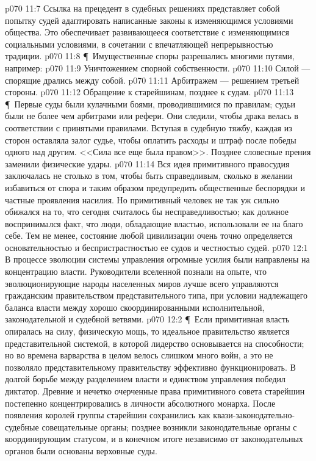 \vs p070 11:7 Ссылка на прецедент в судебных решениях представляет собой попытку судей адаптировать написанные законы к изменяющимся условиями общества. Это обеспечивает развивающееся соответствие с изменяющимися социальными условиями, в сочетании с впечатляющей непрерывностью традиции.
\vs p070 11:8 \P\ Имущественные споры разрешались многими путями, например:
\vs p070 11:9 \bibnobreakspace Уничтожением спорной собственности.
\vs p070 11:10 \bibnobreakspace Силой --- спорящие дрались между собой.
\vs p070 11:11 \bibnobreakspace Арбитражем --- решением третьей стороны.
\vs p070 11:12 \bibnobreakspace Обращение к старейшинам, позднее к судам.
\vs p070 11:13 \P\ Первые суды были кулачными боями, проводившимися по правилам; судьи были не более чем арбитрами или рефери. Они следили, чтобы драка велась в соответствии с принятыми правилами. Вступая в судебную тяжбу, каждая из сторон оставляла залог судье, чтобы оплатить расходы и штраф после победы одного над другим. <<Сила все еще была правом>>. Позднее словесные прения заменили физические удары.
\vs p070 11:14 Вся идея примитивного правосудия заключалась не столько в том, чтобы быть справедливым, сколько в желании избавиться от спора и таким образом предупредить общественные беспорядки и частные проявления насилия. Но примитивный человек не так уж сильно обижался на то, что сегодня считалось бы несправедливостью; как должное воспринимался факт, что люди, обладающие властью, использовали ее на благо себе. Тем не менее, состояние любой цивилизации очень точно определяется основательностью и беспристрастностью ее судов и честностью судей.
\vs p070 12:1 В процессе эволюции системы управления огромные усилия были направлены на концентрацию власти. Руководители вселенной познали на опыте, что эволюционирующие народы населенных миров лучше всего управляются гражданским правительством представительного типа, при условии надлежащего баланса власти между хорошо скоординированными исполнительной, законодательной и судебной ветвями.
\vs p070 12:2 \P\ Если примитивная власть опиралась на силу, физическую мощь, то идеальное правительство является представительной системой, в которой лидерство основывается на способности; но во времена варварства в целом велось слишком много войн, а это не позволяло представительному правительству эффективно функционировать. В долгой борьбе между разделением власти и единством управления победил диктатор. Древние и нечетко очерченные права примитивного совета старейшин постепенно концентрировались в личности абсолютного монарха. После появления королей группы старейшин сохранились как квази\hyp{}законодательно\hyp{}судебные совещательные органы; позднее возникли законодательные органы с координирующим статусом, и в конечном итоге независимо от законодательных органов были основаны верховные суды.
